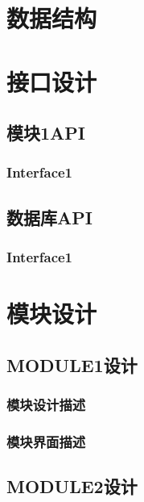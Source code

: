 \documentclass[a4paper,12pt]{report}
\begin{document}
	\chapter{数据结构}
	\chapter{接口设计}
		\section{模块1API}
			\subsection{Interface1}
		\section{数据库API}
			\subsection{Interface1}
	\chapter{模块设计}
		\section{MODULE1设计}
			\subsection{模块设计描述}
			\subsection{模块界面描述}
		\section{MODULE2设计}
	
\end{document}
